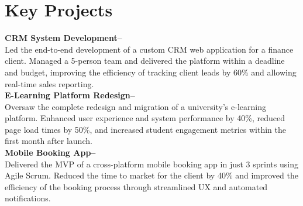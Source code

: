 \documentclass[a4paper,10pt]{article}
\begin{document}
\section*{Key Projects}
\textbf{CRM System Development–}  \\
Led the end-to-end development of a custom CRM web application for a finance client. Managed a 5-person team and delivered the platform within a deadline and budget, improving the efficiency of tracking client leads by 60\% and allowing real-time sales reporting.\\
\textbf{E-Learning Platform Redesign–} \\
Oversaw the complete redesign and migration of a university’s e-learning platform. Enhanced user experience and system performance by 40\%, reduced page load times by 50\%, and increased student engagement metrics within the first month after launch.\\
\textbf{Mobile Booking App–} \\
Delivered the MVP of a cross-platform mobile booking app in just 3 sprints using Agile Scrum. Reduced the time to market for the client by 40\% and improved the efficiency of the booking process through streamlined UX and automated notifications.\\
\end{document}
